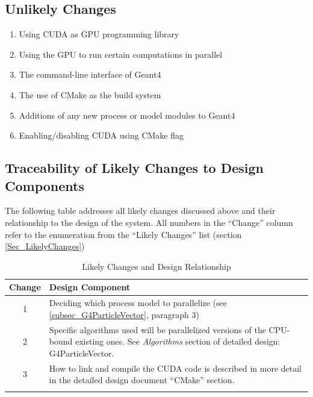 \documentclass[12pt]{article}
\begin{document}
\subsection{Unlikely Changes} %
\begin{enumerate}
\item Using CUDA as GPU programming library
\item Using the GPU to run certain computations in parallel
\item The command-line interface of Geant4
\item The use of CMake as the build system
\item Additions of any new process or model modules to Geant4
\item Enabling/disabling CUDA using CMake flag
\end{enumerate}

\subsection{Traceability of Likely Changes to Design Components}
The following table addresses all likely changes discussed above and their relationship to the design of the system. All numbers in the ``Change'' column refer to the enumeration from the ``Likely Changes'' list (section \ref{Sec_LikelyChanges})

\begin{center}
\begin{longtable}{c >{\raggedright\arraybackslash}p{}}

\caption{Likely Changes and Design Relationship}\label{Table_LikelyChangesAndDesign}
\\\toprule
\bf Change & \bf Design Component\\\toprule
\arrayrulecolor{lightgray}

1 & Deciding which process model to parallelize (see \ref{subsec_G4ParticleVector}, paragraph 3)\\\hline
2 & Specific algorithms used will be parallelized versions of the CPU-bound existing ones. See \emph{Algorithms} section of detailed design: G4ParticleVector.\\\hline
3 & How to link and compile the CUDA code is described in more detail in the detailed design document ``CMake'' section.\\
\arrayrulecolor{black}
\bottomrule
\end{longtable}
\end{center}
\end{document}
